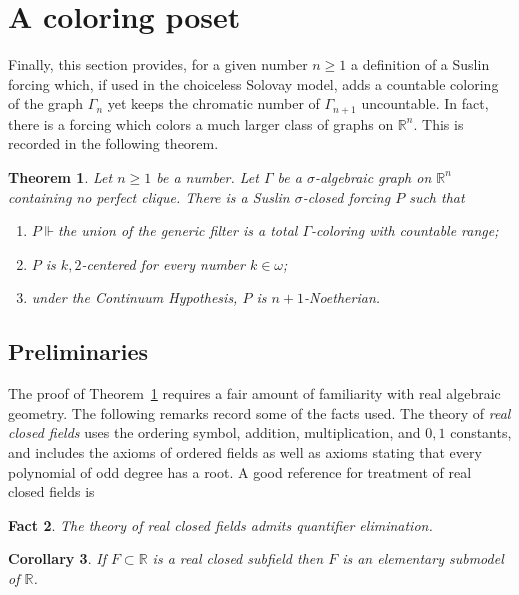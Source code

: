 \documentclass{article}
\newcommand{\gw}{\omega}
\newcommand{\gs}{\sigma}
\newtheorem{theorem}{Theorem}[section]
\newtheorem{corollary}[theorem]{Corollary}
\newtheorem{fact}[theorem]{Fact}
\theoremstyle{definition}
\begin{document}
\section{A coloring poset}

Finally, this section provides, for a given number $n\geq 1$ a definition of a Suslin forcing which, if used in the choiceless Solovay model, adds a countable coloring of the graph $\Gamma_n$ yet keeps the chromatic number of $\Gamma_{n+1}$ uncountable. In fact, there is a forcing which colors a much larger class of graphs on $\mathbb{R}^n$. This is recorded in the following theorem.


\begin{theorem}
\label{posettheorem}
Let $n\geq 1$ be a number. Let $\Gamma$ be a $\gs$-algebraic graph on $\mathbb{R}^n$ containing no perfect clique. There is a Suslin $\gs$-closed forcing $P$ such that

\begin{enumerate}
\item $P\Vdash$the union of the generic filter is a total $\Gamma$-coloring with countable range;
\item $P$ is $k, 2$-centered for every number $k\in\gw$;
\item under the Continuum Hypothesis, $P$ is $n+1$-Noetherian.
\end{enumerate}
\end{theorem}


\subsection{Preliminaries}

The proof of Theorem~\ref{posettheorem} requires a fair amount of familiarity with real algebraic geometry. The following remarks record some of the facts used. The theory of \emph{real closed fields} uses the ordering symbol, addition, multiplication, and $0, 1$ constants, and includes the axioms of ordered fields as well as axioms stating that every polynomial of odd degree has a root. A good reference for treatment of real closed fields is \cite[Section 3.3]{marker:book}

\begin{fact}
The theory of real closed fields admits quantifier elimination.
\end{fact}

\begin{corollary}
If $F\subset\mathbb{R}$ is a real closed subfield then $F$ is an elementary submodel of $\mathbb{R}$.
\end{corollary}
\end{document}
